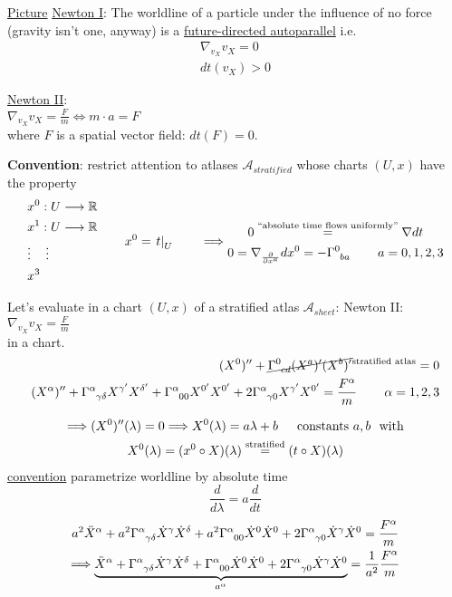 \underline{Picture}
\underline{Newton I}: The worldline of a particle under the influence of no force (gravity isn't one, anyway) is a \underline{future-directed autoparallel} i.e.
\[
\begin{gathered}
  \nabla_{v_{X}} v_{X} = 0 \\
  dt(v_{X}) > 0 
\end{gathered}
\]

\underline{Newton II}: \\
$\nabla_{v_{X}} v_X = \frac{F}{m} \Longleftrightarrow m \cdot a = F$ \\
where $F$ is a spatial vector field: $dt(F) = 0$.

\textbf{Convention}: restrict attention to atlases $\mathcal{A}_{stratified}$ whose charts $(U,x)$ have the property
\[
\begin{aligned}
  & x^0 : U \to \mathbb{R} \\
  & x^1 : U \to \mathbb{R} \\
  & \vdots \quad \, \vdots \\
  & x^3
\end{aligned}
\quad \quad \,
x^0 = \left. t \right|_{U} \quad\quad \, \Longrightarrow \begin{gathered} 0 \overset{\text{``absolute time flows uniformly''} }{=} \nabla dt \\
0 = \nabla_{\cibasis{x^a}} dx^0 = - \ccf{0}{ba} \quad \quad \, a = 0,1,2,3
\end{gathered}
\]

Let's evaluate in a chart $(U,x)$ of a stratified atlas $\mathcal{A}_{sheet}$: Newton II: \\
$\nabla_{v_X} v_X = \frac{F}{m}$ \\
in a chart.
\begin{align*}
(X^0)'' + \cancel{\ccf{0}{cd} (X^a)' (X^b)' }^{ \text{stratified atlas}} = 0  \\
(X^{\alpha})'' + \ccf{\alpha}{\gamma \delta} X^{\gamma'} X^{\delta'} + \ccf{\alpha}{00} X^{0'} X^{0'} + 2\ccf{\alpha}{\gamma 0} X^{\gamma'} X^{0'} = \frac{F^{\alpha}}{m} \quad \quad \, \alpha = 1,2,3
\end{align*}

\[
\begin{gathered}
\Longrightarrow (X^0)''(\lambda) = 0 \Longrightarrow X^0(\lambda) = a\lambda + b \quad \, \text{ constants $a,b$ } \text{ with} \\
X^0(\lambda) = (x^0 \circ X)(\lambda) \overset{\text{stratified}}{=} (t \circ X)(\lambda)
\end{gathered}
\]
\underline{convention} parametrize worldline by absolute time
\[
\frac{d}{d\lambda} = a \frac{d}{dt}
\]
\[
\begin{gathered}
a^2 \ddot{X}^{\alpha} + a^2 \ccf{\alpha}{\gamma \delta} \dot{X}^{\gamma} \dot{X}^{\delta} + a^2 \ccf{\alpha}{00} \dot{X}^0 \dot{X}^0 + 2\ccf{\alpha}{\gamma 0} \dot{X}^{\gamma} \dot{X}^{0} = \frac{F^{\alpha}}{m} \\
\Longrightarrow \underbrace{\ddot{X}^{\alpha} + \ccf{\alpha}{\gamma \delta} \dot{X}^{\gamma} \dot{X}^{\delta} + \ccf{\alpha}{00} \dot{X}^0 \dot{X}^0 + 2\ccf{\alpha}{\gamma 0} \dot{X}^{\gamma} \dot{X}^{0}}_{a^{\alpha}} = \frac{1}{a^2} \frac{F^{\alpha}}{m}
\end{gathered}
\]
